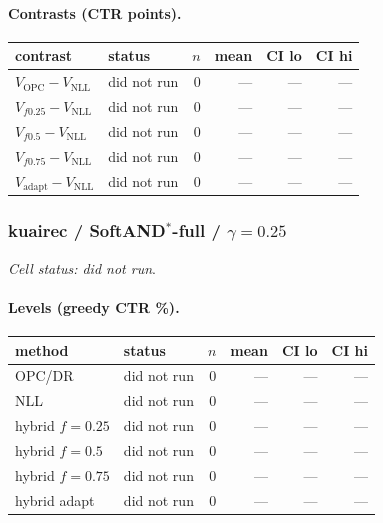 \documentclass[10pt,a4paper]{article}
\begin{document}
\paragraph{Contrasts (CTR points).}
{\centering\small\begin{tabular}{llrrrr}
\toprule contrast & status & $n$ & mean & CI lo & CI hi \\
\midrule
$V_{\mathrm{OPC}}-V_{\mathrm{NLL}}$ & did not run & 0 & --- & --- & --- \\
$V_{f0.25}-V_{\mathrm{NLL}}$ & did not run & 0 & --- & --- & --- \\
$V_{f0.5}-V_{\mathrm{NLL}}$ & did not run & 0 & --- & --- & --- \\
$V_{f0.75}-V_{\mathrm{NLL}}$ & did not run & 0 & --- & --- & --- \\
$V_{\mathrm{adapt}}-V_{\mathrm{NLL}}$ & did not run & 0 & --- & --- & --- \\
\bottomrule\end{tabular}\par}
\bigskip
\subsubsection{kuairec / SoftAND$^*$-full / $\gamma=0.25$}
\emph{Cell status: did not run}.
\paragraph{Levels (greedy CTR \%).}
{\centering\small\begin{tabular}{llrrrr}
\toprule method & status & $n$ & mean & CI lo & CI hi \\
\midrule
OPC/DR & did not run & 0 & --- & --- & --- \\
NLL & did not run & 0 & --- & --- & --- \\
hybrid $f{=}0.25$ & did not run & 0 & --- & --- & --- \\
hybrid $f{=}0.5$ & did not run & 0 & --- & --- & --- \\
hybrid $f{=}0.75$ & did not run & 0 & --- & --- & --- \\
hybrid adapt & did not run & 0 & --- & --- & --- \\
\bottomrule\end{tabular}\par}
\end{document}
